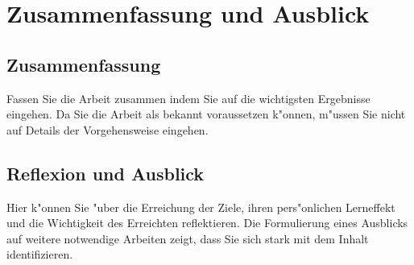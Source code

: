 \chapter{Zusammenfassung und Ausblick}

\section{Zusammenfassung}

Fassen Sie die Arbeit zusammen indem Sie auf die wichtigsten Ergebnisse eingehen. Da Sie die Arbeit als bekannt voraussetzen k"onnen, m"ussen Sie nicht auf Details der Vorgehensweise eingehen.

\section{Reflexion und Ausblick}

Hier k"onnen Sie "uber die Erreichung der Ziele, ihren pers"onlichen Lerneffekt und die Wichtigkeit des Erreichten reflektieren. Die Formulierung eines Ausblicks auf weitere notwendige Arbeiten zeigt, dass Sie sich stark mit dem Inhalt identifizieren.
